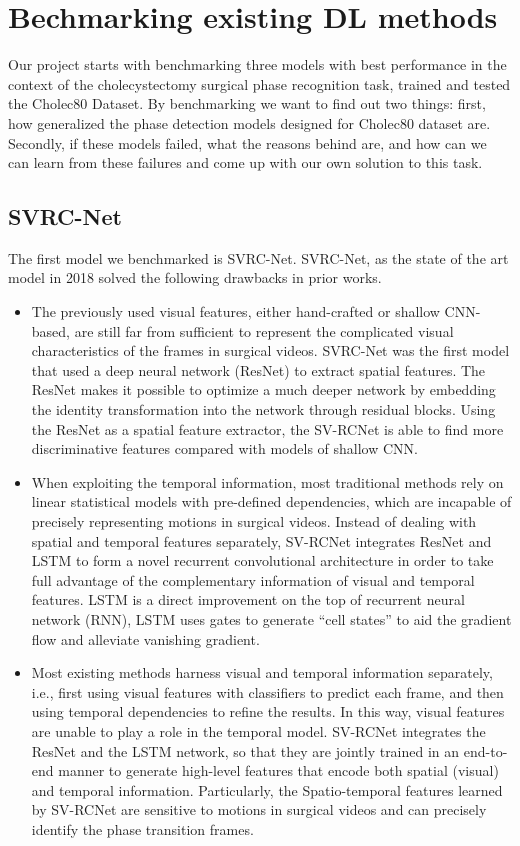 \documentclass[11pt]{article} \usepackage[top=1in, bottom=1in, left=1in, right=1in]{geometry}
\begin{document}
\section{Bechmarking existing DL methods}
Our project starts with benchmarking three models with best performance in the context of the cholecystectomy surgical phase recognition task, trained and tested the Cholec80 Dataset\cite{EndoNet}. By benchmarking we want to find out two things: first, how generalized the phase detection models designed for Cholec80 dataset are. Secondly, if these models failed, what the reasons behind are, and how can we can learn from these failures and come up with our own solution to this task.

\subsection{SVRC-Net}
The first model we benchmarked is SVRC-Net.\cite{SV-RCNet} SVRC-Net, as the state of the art model in 2018 solved the following drawbacks in prior works. 
\begin{itemize}
  \item The previously used visual features, either hand-crafted or shallow CNN-based, are still far from sufficient to represent the complicated visual characteristics of the frames in surgical videos. SVRC-Net was the first model that used a deep neural network (ResNet) to extract spatial features. The ResNet makes it possible to optimize a much deeper network by embedding the identity transformation into the network through residual blocks. Using the ResNet as a spatial feature extractor, the SV-RCNet is able to find more discriminative features compared with models of shallow CNN. 
  \item When exploiting the temporal information, most traditional methods rely on linear statistical models with pre-defined dependencies, which are incapable of precisely representing motions in surgical videos. Instead of dealing with spatial and temporal features separately, SV-RCNet integrates ResNet and LSTM to form a novel recurrent convolutional architecture in order to take full advantage of the complementary information of visual and temporal features. LSTM is a direct improvement on the top of recurrent neural network (RNN), LSTM uses gates to generate “cell states” to aid the gradient flow and alleviate vanishing gradient.
  \item Most existing methods harness visual and temporal information separately, i.e., first using visual features with classifiers to predict each frame, and then using temporal dependencies to refine the results. In this way, visual features are unable to play a role in the temporal model. SV-RCNet integrates the ResNet and the LSTM network, so that they are jointly trained in an end-to-end manner to generate high-level features that encode both spatial (visual) and temporal information. Particularly, the Spatio-temporal features learned by SV-RCNet are sensitive to motions in surgical videos and can precisely identify the phase transition frames.
\end{itemize}
\end{document}
